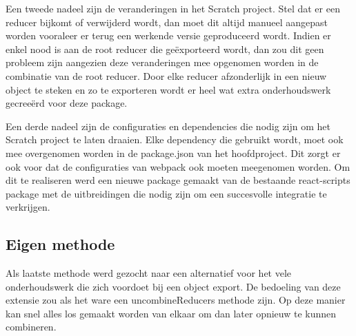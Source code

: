 Een tweede nadeel zijn de veranderingen in het Scratch project. Stel dat er een reducer bijkomt of verwijderd wordt, dan moet dit altijd manueel aangepast worden vooraleer er terug een werkende versie geproduceerd wordt. Indien er enkel nood is aan de root reducer die geëxporteerd wordt, dan zou dit geen probleem zijn aangezien deze veranderingen mee opgenomen worden in de combinatie van de root reducer. Door elke reducer afzonderlijk in een nieuw object te steken en zo te exporteren wordt er heel wat extra onderhoudswerk gecreeërd voor deze package.  

Een derde nadeel zijn de configuraties en dependencies die nodig zijn om het Scratch project te laten draaien. 
Elke dependency die gebruikt wordt, moet ook mee overgenomen worden in de package.json van het hoofdproject. Dit zorgt er ook voor dat de configuraties van webpack ook moeten meegenomen worden. Om dit te realiseren werd een nieuwe package gemaakt van de bestaande react-scripts package met de uitbreidingen die nodig zijn om een succesvolle integratie te verkrijgen.

\subsection{Eigen methode}
Als laatste methode werd gezocht naar een alternatief voor het vele onderhoudswerk die zich voordoet bij een object export. De bedoeling van deze extensie zou als het ware een uncombineReducers methode zijn. Op deze manier kan snel alles los gemaakt worden van elkaar om dan later opnieuw te kunnen combineren. 

